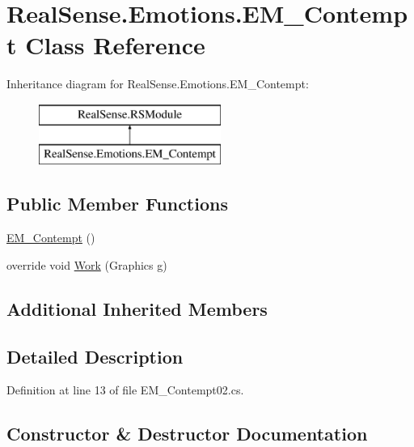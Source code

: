\hypertarget{class_real_sense_1_1_emotions_1_1_e_m___contempt}{}\section{Real\+Sense.\+Emotions.\+E\+M\+\_\+\+Contempt Class Reference}
\label{class_real_sense_1_1_emotions_1_1_e_m___contempt}
Inheritance diagram for Real\+Sense.\+Emotions.\+E\+M\+\_\+\+Contempt\+:\begin{figure}[H]
\begin{center}
\leavevmode
\includegraphics[height=2.000000cm]{class_real_sense_1_1_emotions_1_1_e_m___contempt}
\end{center}
\end{figure}
\subsection*{Public Member Functions}
\begin{DoxyCompactItemize}
\item 
\hyperlink{class_real_sense_1_1_emotions_1_1_e_m___contempt_af2203e6c540c756cd6b8d0190d04c46f}{E\+M\+\_\+\+Contempt} ()
\item 
override void \hyperlink{class_real_sense_1_1_emotions_1_1_e_m___contempt_a7ea208f926c1888f028cbe6d6fe14e2f}{Work} (Graphics g)
\end{DoxyCompactItemize}
\subsection*{Additional Inherited Members}


\subsection{Detailed Description}


Definition at line 13 of file E\+M\+\_\+\+Contempt02.\+cs.



\subsection{Constructor \& Destructor Documentation}
\mbox{\label{class_real_sense_1_1_emotions_1_1_e_m___contempt_af2203e6c540c756cd6b8d0190d04c46f}} 
